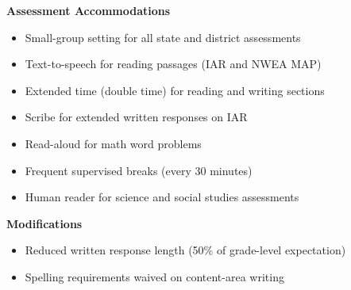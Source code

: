 \begin{minipage}{0.48\textwidth}
\begin{iepbox}
{\bfseries\color{IEPNavy}\Large Assessment Accommodations}\\
\begin{itemize}[leftmargin=*,nosep,label=\textcolor{IEPTeal}{\faCheckSquare}]
  \item Small-group setting for all state and district assessments
  \item Text-to-speech for reading passages (IAR and NWEA MAP)
  \item Extended time (double time) for reading and writing sections
  \item Scribe for extended written responses on IAR
  \item Read-aloud for math word problems
  \item Frequent supervised breaks (every 30 minutes)
  \item Human reader for science and social studies assessments
\end{itemize}
\vspace{4pt}
{\bfseries\color{IEPNavy} Modifications}\\[2pt]
\begin{itemize}[leftmargin=*,nosep,label=\textcolor{IEPGold}{$\bullet$}]
  \item Reduced written response length (50\% of grade-level expectation)
  \item Spelling requirements waived on content-area writing
\end{itemize}
\end{iepbox}
\end{minipage}

\vspace{10pt}
